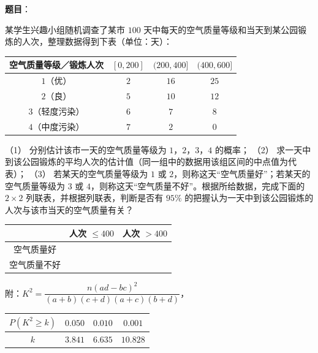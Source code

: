 \begin{answer}

\textbf{题目}：

某学生兴趣小组随机调查了某市 $100$ 天中每天的空气质量等级和当天到某公园锻炼的人次，整理数据得到下表（单位：天）：

\begin{center}
\begin{tabular}{cccc}
\toprule
空气质量等级／锻炼人次 & $[0,200]$ & $(200,400]$ & $(400,600]$ \\
\midrule
$1$（优） & $2$ & $16$ & $25$ \\
$2$（良） & $5$ & $10$ & $12$ \\
$3$（轻度污染） & $6$ & $7$ & $8$ \\
$4$（中度污染） & $7$ & $2$ & $0$ \\
\bottomrule
\end{tabular}
\end{center}

（1） 分别估计该市一天的空气质量等级为 $1$，$2$，$3$，$4$ 的概率；
（2） 求一天中到该公园锻炼的平均人次的估计值（同一组中的数据用该组区间的中点值为代表）；
（3） 若某天的空气质量等级为 $1$ 或 $2$，则称这天“空气质量好”；若某天的空气质量等级为 $3$ 或 $4$，则称这天“空气质量不好”。根据所给数据，完成下面的 $2\times2$ 列联表，并根据列联表，判断是否有 $95\%$ 的把握认为一天中到该公园锻炼的人次与该市当天的空气质量有关？

\begin{center}
\begin{tabular}{ccc}
\toprule
 & 人次 $\leqslant400$ & 人次 $>400$ \\
\midrule
空气质量好 &  &  \\
空气质量不好 &  &  \\
\bottomrule
\end{tabular}
\end{center}

附：$K^2=\dfrac{n(ad-bc)^2}{(a+b)(c+d)(a+c)(b+d)}$，

\begin{center}
\begin{tabular}{cccc}
\toprule
$P(K^2\geqslant k)$ & $0.050$ & $0.010$ & $0.001$ \\
\midrule
$k$ & $3.841$ & $6.635$ & $10.828$ \\
\bottomrule
\end{tabular}
\end{center}


\end{answer}
